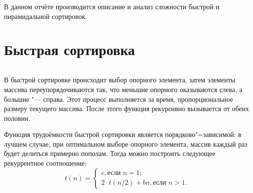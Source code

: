 \documentclass[otchet]{../SCWorks}
\begin{document}

\date{2026}

\maketitle

\secNumbering

\tableofcontents




\intro
В данном отчёте производится описание и анализ сложности быстрой и пирамидальной сортировок.

\section{Быстрая сортировка}
\small
\inputminted[breaklines]{cpp}{./quick_sort.cpp}
\normalsize

В быстрой сортировке происходит выбор опорного элемента, затем элементы массива переупорядочиваются так, что меньшие опорного оказываются слева, а большие "--- справа. Этот процесс выполняется за время, пропорциональное размеру текущего массива. После этого функция рекурсивно вызывается от обеих половин.

Функция трудоёмкости быстрой сортировки является порядково"=зависимой: в лучшем случае, при оптимальном выборе опорного элемента, массив каждый раз будет делиться примерно пополам. Тогда можно построить следующее рекуррентное соотношение:
\begin{equation}
	t(n) =
\begin{cases}
	c, \text{если } n = 1; \\
	2 \cdot t(n / 2) + bn, \text{если } n > 1.
\end{cases}
\end{equation}
\end{document}
